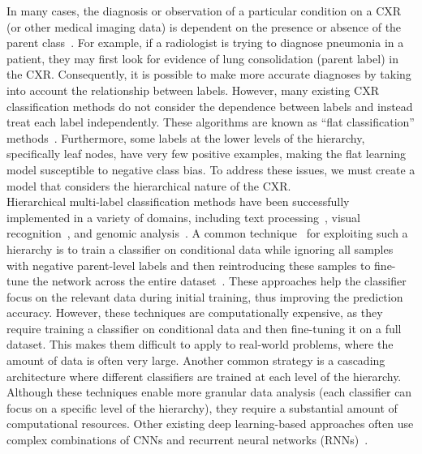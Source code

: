 \documentclass[authoryear,preprint,review,12pt]{elsarticle}
\begin{document}
In many cases, the diagnosis or observation of a particular condition on a CXR (or other medical imaging data) is dependent on the presence or absence of the parent class~\cite{vaneeden_Relationship_2012}. For example, if a radiologist is trying to diagnose pneumonia in a patient, they may first look for evidence of lung consolidation (parent label) in the CXR\@. Consequently, it is possible to make more accurate diagnoses by taking into account the relationship between labels\@. However, many existing CXR classification methods do not consider the dependence between labels and instead treat each label independently. These algorithms are known as ``flat classification'' methods~\cite{alaydie_Exploiting_2012}. Furthermore, some labels at the lower levels of the hierarchy, specifically leaf nodes, have very few positive examples, making the flat learning model susceptible to negative class bias. To address these issues, we must create a model that considers the hierarchical nature of the CXR\@.
\\
Hierarchical multi-label classification methods have been successfully implemented in a variety of domains, including text processing~\cite{aly_Hierarchical_2019}, visual recognition~\cite{bi_Mandatory_2014}, and genomic analysis~\cite{bi_BayesOptimal_2015}. A common technique~\cite{chen_Deep_2019} for exploiting such a hierarchy is to train a classifier on conditional data while ignoring all samples with negative parent-level labels and then reintroducing these samples to fine-tune the network across the entire dataset~\cite{chen_Deep_2019}. These approaches help the classifier focus on the relevant data during initial training, thus improving the prediction accuracy.  However, these techniques are computationally expensive, as they require training a classifier on conditional data and then fine-tuning it on a full dataset. This makes them difficult to apply to real-world problems, where the amount of data is often very large.   Another common strategy is a cascading architecture where different classifiers are trained at each level of the hierarchy. Although these techniques enable more granular data analysis (each classifier can focus on a specific level of the hierarchy), they require a substantial amount of computational resources. Other existing deep learning-based approaches often use complex combinations of CNNs and recurrent neural networks (RNNs)~\cite{guo_CNNRNN_2018,kowsari_HDLTex_2017}.
\end{document}
